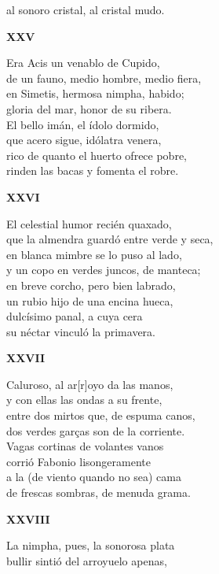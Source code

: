\documentclass[11pt,twoside]{article}
\begin{document}
al sonoro cristal, al cristal mudo.\par\poend
%
\begin{center}
	\textbf{XXV}
\end{center}\postart
Era Acis un venablo de Cupido,\\
de un fauno, medio hombre, medio fiera,\\
en Simetis, hermosa nimpha, habido;\\
gloria del mar, honor de su ribera.\\
El bello imán, el ídolo dormido,\\
que acero sigue, idólatra venera,\\
rico de quanto el huerto ofrece pobre,\\
rinden las bacas y fomenta el robre.\par\poend
\repage
%
\begin{center}
	\textbf{XXVI}
\end{center}\postart
El celestial humor recién quaxado,\\
que la almendra guardó entre verde y seca,\\
en blanca mimbre se lo puso al lado,\\
y un copo en verdes juncos, de manteca;\\
en breve corcho, pero bien labrado,\\
un rubio hijo de una encina hueca,\\
dulcísimo panal, a cuya cera\\
su néctar vinculó la primavera.\par\poend
%
\begin{center}
	\textbf{XXVII}
\end{center}\postart
Caluroso, al ar[r]oyo da las manos,\\
y con ellas las ondas a su frente,\\
entre dos mirtos que, de espuma canos,\\
dos verdes garças son de la corriente.\\
Vagas cortinas de volantes vanos\\
corrió Fabonio lisongeramente\\
a la (de viento quando no sea) cama\\
de frescas sombras, de menuda grama.\par\poend
%
\begin{center}
	\textbf{XXVIII}
\end{center}\postart
La nimpha, pues, la sonorosa plata\\
bullir sintió del arroyuelo apenas,\\
\end{document}
